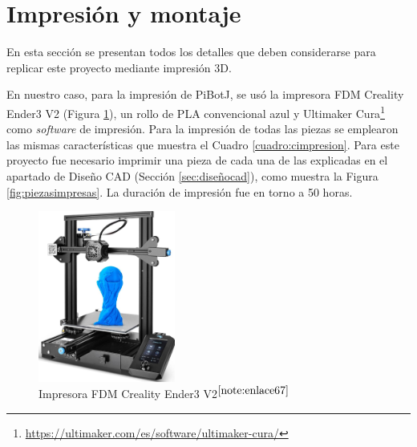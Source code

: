\section{Impresión y montaje}
\label{sec:impresionmontaje}

En esta sección se presentan todos los detalles que deben considerarse para replicar este proyecto mediante impresión 3D. 

En nuestro caso, para la impresión de PiBotJ, se usó la impresora FDM Creality Ender3 V2 (Figura \ref{fig:impresora}), un rollo de PLA convencional azul y Ultimaker Cura\footnote{\url{https://ultimaker.com/es/software/ultimaker-cura/}} como \textit{software} de impresión. Para la impresión de todas las piezas se emplearon las mismas características que muestra el Cuadro \ref{cuadro:cimpresion}. Para este proyecto fue necesario imprimir una pieza de cada una de las explicadas en el apartado de Diseño CAD (Sección \ref{sec:diseñocad}), como muestra la Figura \ref{fig:piezasimpresas}. La duración de impresión fue en torno a 50 horas.
 
\begin{figure} [h!]
	\begin{center}
		\includegraphics[width=4.5cm]{figs/cap5/impresora.jpg}
	\end{center}
	\caption{Impresora FDM Creality Ender3 V2$^{\ref{note:enlace67}}$} 
	\label{fig:impresora}
\end{figure}

\setcounter{footnote}{67} %

